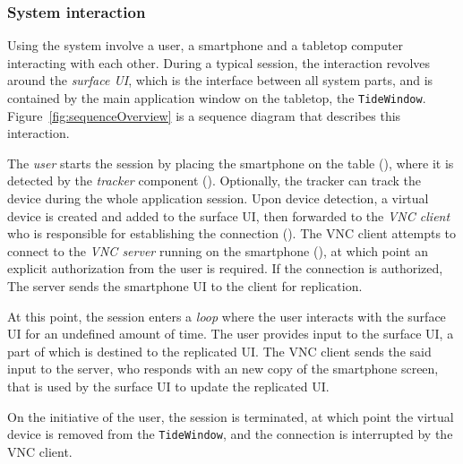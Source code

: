 \subsubsection{System interaction}

Using the system involve a user, a smartphone and a tabletop computer interacting with each other.
During a typical session, the interaction revolves around the \emph{surface UI}, which is the interface between all system parts, and is contained by the main application window on the tabletop, the \texttt{TideWindow}.
Figure~\ref{fig:sequenceOverview} is a sequence diagram that describes this interaction.

The \emph{user} starts the session by placing the smartphone on the table (), where it is detected by the \emph{tracker} component ().
Optionally, the tracker can track the device during the whole application session.
Upon device detection, a virtual device is created and added to the surface UI, then forwarded to the \emph{VNC client} who is responsible for establishing the connection ().
The VNC client attempts to connect to the \emph{VNC server} running on the smartphone (), at which point an explicit authorization from the user is required.
If the connection is authorized, The server sends the smartphone UI to the client for replication.

At this point, the session enters a \emph{loop} where the user interacts with the surface UI for an undefined amount of time.
The user provides input to the surface UI, a part of which is destined to the replicated UI.
The VNC client sends the said input to the server, who responds with an new copy of the smartphone screen, that is used by the surface UI to update the replicated UI.

On the initiative of the user, the session is terminated, at which point the virtual device is removed from the \texttt{TideWindow}, and the connection is interrupted by the VNC client.

